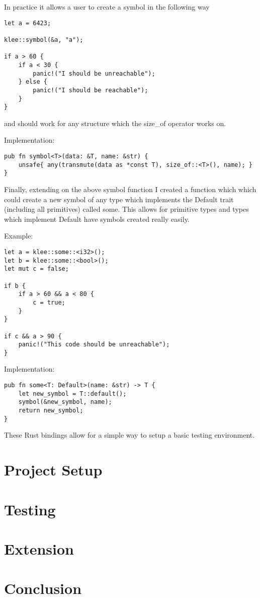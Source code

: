 \documentclass{report}
\begin{document}
In practice it allows a user to create a symbol in the following way

\begin {lstlisting}
let a = 6423;

klee::symbol(&a, "a");

if a > 60 {
	if a < 30 {
		panic!("I should be unreachable");
	} else {
		panic!("I should be reachable");
	}
}
\end {lstlisting}

and should work for any structure which the size_of operator works on.

Implementation:
\begin {lstlisting}
pub fn symbol<T>(data: &T, name: &str) {
    unsafe{ any(transmute(data as *const T), size_of::<T>(), name); }
}
\end {lstlisting}

Finally, extending on the above symbol function I created a function which which could create a new symbol of any type which implements the Default trait (including all primitives) called some. This allows for primitive types and types which implement Default have symbols created really easily.

Example:
\begin{lstlisting}
let a = klee::some::<i32>();
let b = klee::some::<bool>();
let mut c = false;

if b {
	if a > 60 && a < 80 {
		c = true;
	}
}

if c && a > 90 {
	panic!("This code should be unreachable");
}
\end{lstlisting}

Implementation:
\begin{lstlisting}
pub fn some<T: Default>(name: &str) -> T {
    let new_symbol = T::default();
    symbol(&new_symbol, name);
    return new_symbol;
}
\end{lstlisting}

These Rust bindings allow for a simple way to setup a basic testing environment.
\chapter {Project Setup}
\chapter {Testing}
\chapter {Extension}
\chapter {Conclusion}
\end{document}

